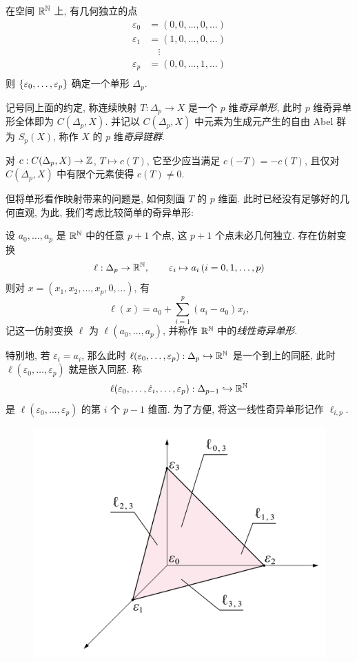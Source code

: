 在空间 $ \mathbb{R}^{\mathbb{N}} $ 上, 有几何独立的点
\[
	\begin{aligned}
		\varepsilon_0&=(0,0,\dots,0,\dots)\\
		\varepsilon_1&=(1,0,\dots,0,\dots)\\
		&\quad\vdots\\
		\varepsilon_p&=(0,0,\dots,1,\dots)\\
	\end{aligned}
\]
则 $ \left\{ \varepsilon_0,\dots,\varepsilon_p \right\} $ 确定一个单形 $ \Delta_p $.

\begin{Definition}[奇异单形]
	记号同上面的约定, 称连续映射 $ T : \Delta_p\to X $ 是一个 $ p $ 维\emph{奇异单形}, 此时 $ p $ 维奇异单形全体即为 $ C(\Delta_p,X) $. 并记以 $ C(\Delta_p,X) $ 中元素为生成元产生的自由 Abel 群为 $ S_p(X) $, 称作 $ X $ 的 $ p $ 维\emph{奇异链群}.
\end{Definition}

对 $ c : C(\Delta_p,X)\to\mathbb{Z} $, $ T\mapsto c(T) $, 它至少应当满足 $ c(-T)=-c(T) $, 且仅对 $ C(\Delta_p,X) $ 中有限个元素使得 $ c(T)\ne 0 $.

但将单形看作映射带来的问题是, 如何刻画 $ T $ 的 $ p $ 维面. 此时已经没有足够好的几何直观, 为此, 我们考虑比较简单的奇异单形:

\begin{Definition}[线性奇异单形]
	设 $ a_0,\dots,a_p $ 是 $ \mathbb{R}^{\mathbb{N}} $ 中的任意 $ p+1 $ 个点, 这 $ p+1 $ 个点未必几何独立. 存在仿射变换
	\[
		\ell : \Delta_p\to\mathbb{R}^{\mathbb{N}},\qquad \varepsilon_i\mapsto a_i\,(i=0,1,\dots,p)
	\]
	则对 $ x=(x_1,x_2,\dots,x_p,0,\dots) $, 有
	\[
		\ell(x)=a_0+\sum_{i=1}^p(a_i-a_0)x_i,
	\]
	记这一仿射变换 $ \ell $ 为 $ \ell(a_0,\dots,a_p) $, 并称作 $ \mathbb{R}^{\mathbb{N}} $ 中的\emph{线性奇异单形}.
\end{Definition}

特别地, 若 $ \varepsilon_i=a_i $, 那么此时 $ \ell(\varepsilon_0,\dots,\varepsilon_p) : \Delta_p\hookrightarrow\mathbb{R}^{\mathbb{N}} $ 是一个到上的同胚, 此时 $ \ell(\varepsilon_0,\dots,\varepsilon_p) $ 就是嵌入同胚. 称
\[
	\ell(\varepsilon_0,\dots,\hat{\varepsilon}_i,\dots,\varepsilon_p) : \Delta_{p-1}\hookrightarrow \mathbb{R}^{\mathbb{N}}
\]
是 $ \ell(\varepsilon_0,\dots,\varepsilon_p) $ 的第 $ i $ 个 $ p-1 $ 维面. 为了方便, 将这一线性奇异单形记作 $ \ell_{i,p} $.

\begin{figure}[htbp]
	\centering
	\includegraphics[width=0.4\linewidth]{figures/Sec10-1.png}
\end{figure}

